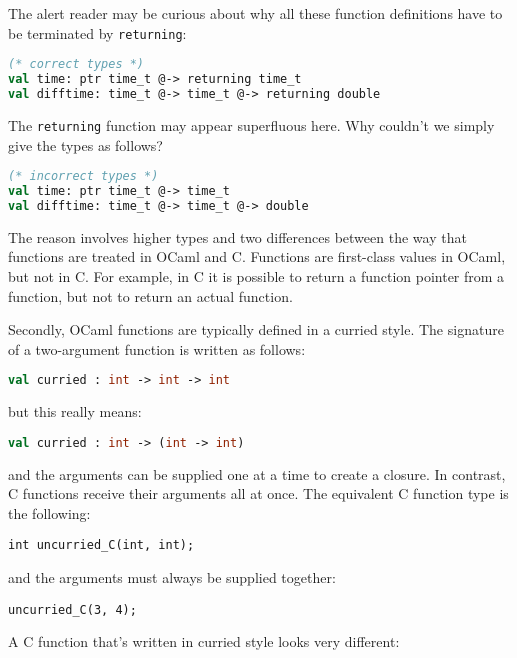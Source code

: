 The alert reader may be curious about why all these function definitions
have to be terminated by \passthrough{\lstinline!returning!}:

\begin{lstlisting}[language=Caml]
(* correct types *)
val time: ptr time_t @-> returning time_t
val difftime: time_t @-> time_t @-> returning double
\end{lstlisting}

The \passthrough{\lstinline!returning!} function may appear superfluous
here. Why couldn't we simply give the types as follows?

\begin{lstlisting}[language=Caml]
(* incorrect types *)
val time: ptr time_t @-> time_t
val difftime: time_t @-> time_t @-> double
\end{lstlisting}

The reason involves higher types and two differences between the way
that functions are treated in OCaml and C. Functions are first-class
values in OCaml, but not in C. For example, in C it is possible to
return a function pointer from a function, but not to return an actual
function.

Secondly, OCaml functions are typically defined in a curried style. The
signature of a two-argument function is written as follows:

\begin{lstlisting}[language=Caml]
val curried : int -> int -> int
\end{lstlisting}

but this really means:

\begin{lstlisting}[language=Caml]
val curried : int -> (int -> int)
\end{lstlisting}

and the arguments can be supplied one at a time to create a closure. In
contrast, C functions receive their arguments all at once. The
equivalent C function type is the following:

\begin{lstlisting}
int uncurried_C(int, int);
\end{lstlisting}

and the arguments must always be supplied together:

\begin{lstlisting}
uncurried_C(3, 4);
\end{lstlisting}

A C function that's written in curried style looks very different:

